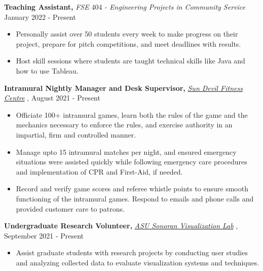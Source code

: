 \documentclass[a4paper]{article}
\begin{document}
    \textbf{Teaching Assistant, } \textit{FSE} 404 \textit{- Engineering Projects in Community Service} \hfill January 2022 - Present\\
    \vspace{-3mm}
    \begin{itemize}
        \itemsep-0.05em
        \item Personally assist over 50 students every week to make progress on their project, prepare for pitch competitions, and meet deadlines with results. 
        \item Host skill sessions where students are taught technical skills like Java and how to use Tableau.
    \end{itemize}


    \textbf{Intramural Nightly Manager and Desk Supervisor, } \textit{{\href{https://fitness.asu.edu/programs/intramurals}{Sun Devil Fitness Centre}} \faExternalLink},   \hfill August 2021 - Present\\
\vspace{-3mm}
\begin{itemize}
    \itemsep-0.05em
    \item Officiate 100+ intramural games, learn both the rules of the game and the mechanics necessary to enforce the rules, and exercise authority in an impartial, firm and controlled manner. 
    \item Manage upto 15 intramural matches per night, and ensured emergency situations were assisted quickly while following emergency care procedures and implementation of CPR and First-Aid, if needed.  
    \item Record and verify game scores and referee whistle points to ensure smooth functioning of the intramural games. Respond to emails and phone calls and provided customer care to patrons.
\end{itemize}



\textbf{Undergraduate Research Volunteer, } \textit{\href{https://news.asu.edu/20200225-solutions-data-driven-quest-resilient-power-systems}{ASU Sonoran Visualization Lab} \faExternalLink}, \hfill September 2021 - Present\\
\vspace{-3mm}
\begin{itemize}
    \itemsep-0.05em
    \item Assist graduate students with research projects by conducting user studies and analyzing collected data to evaluate visualization systems and techniques. 
\end{itemize}
\end{document}
